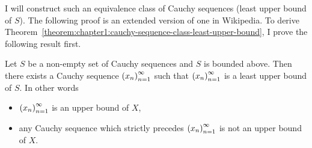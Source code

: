 I will construct such an equivalence class of Cauchy sequences (least upper bound of $S$). The following proof is an extended version of one in Wikipedia. To derive Theorem~\ref{theorem:chapter1:cauchy-sequence-class-least-upper-bound}, I prove the following result first.

\begin{theorem}\label{theorem:chapter1:cauchy-sequence-least-upper-bound}
    Let $S$ be a non-empty set of Cauchy sequences and $S$ is bounded above. Then there exists a Cauchy sequence ${\left({x_{n}}\right)}^{\infty}_{n=1}$ such that ${\left({x_{n}}\right)}^{\infty}_{n=1}$ is a least upper bound of $S$. In other words
    \begin{itemize}[itemsep=0pt]
        \item ${\left({x_{n}}\right)}^{\infty}_{n=1}$ is an upper bound of $X$,
        \item any Cauchy sequence which strictly precedes ${\left({x_{n}}\right)}^{\infty}_{n=1}$ is not an upper bound of $X$.
    \end{itemize}
\end{theorem}

